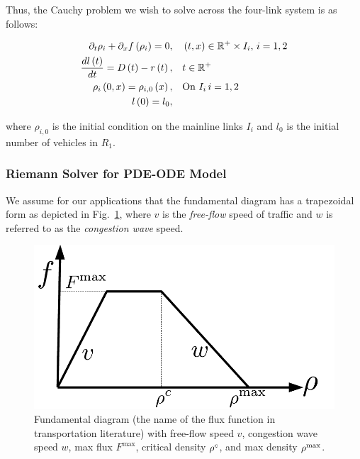 Thus, the Cauchy problem we wish to solve across the four-link system is as follows:

\begin{align}
\partial_t \rho_i + \partial_x f\left(\rho_i\right) = 0, & \quad \left(t,x\right) \in \mathbb{R}^+ \times I_i, \, i = 1,2 \\
\frac{dl\left(t\right)}{dt} = D\left(t\right) - r\left(t\right), & \quad t\in \mathbb{R}^+ \\
\rho_i \left(0,x\right) = \rho_{i,0} \left(x\right), & \quad \text{On } I_i\, i = 1,2 \\
l\left(0\right) = l_0, &
\end{align}

where $\rho_{i,0}$ is the initial condition on the mainline links $I_i$ and $l_0$ is the initial number of vehicles in $R_1$.

\subsubsection{Riemann Solver for PDE-ODE Model}

We assume for our applications that the fundamental diagram has a trapezoidal form as depicted
in Fig.~\ref{fig:Fundamental-diagram-with}, where $v$ is the \emph{free-flow} speed of traffic and $w$ is referred to as the \emph{congestion wave} speed.

\begin{figure}
\centering
\includegraphics[width=0.4\columnwidth]{previous-articles/adjoint/figs-gen/fd}
\caption{Fundamental diagram (the name of the flux function in transportation
literature) with free-flow speed $v$, congestion wave speed $w$,
max flux $F^{\max}$, critical density $\rho^{c}$, and max density
$\rho^{\max}$.\label{fig:Fundamental-diagram-with}}
\end{figure}

